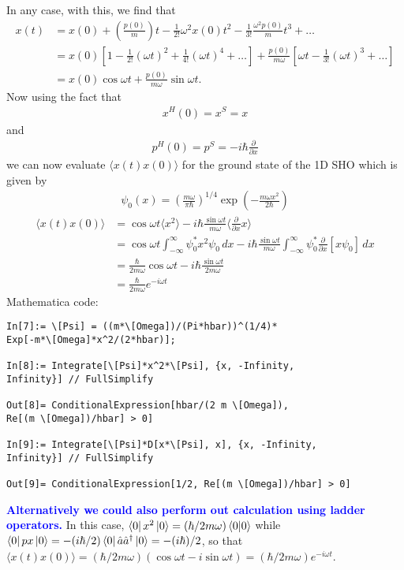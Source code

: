 \documentclass{article}
\theoremstyle{definition}
\newcommand{\p}{\partial}
\newcommand{\f}[2]{\frac{#1}{#2}}
\newcommand{\lp}{\left(}
\newcommand{\rp}{\right)}
\newcommand{\lb}{\left[}
\newcommand{\rb}{\right]}
\begin{document}
In any case, with this, we find that
\begin{align*}
x(t) &= x(0) + \lp \f{p(0)}{m} \rp t - \f{1}{2!} \omega^2 x(0) t^2 - \f{1}{3!}\f{\omega^2 p(0)}{m} t^3 + \dots\\
&= x(0)\lb 1 - \f{1}{2!}(\omega t)^2 + \f{1}{4!}(\omega t)^4 + \dots \rb + \f{p(0)}{m\omega}\lb \omega t - \f{1}{3!} (\omega t )^3 + \dots \rb  \\
&= x(0)\cos\omega t + \f{p(0)}{m\omega}\sin\omega t.
\end{align*}
Now using the fact that 
\begin{align*}
x^H(0) = x^S = x 
\end{align*}
and 
\begin{align*}
p^H(0) = p^S = -i\hbar \f{\p}{\p x}
\end{align*}
we can now evaluate $\langle x(t) x(0)\rangle$ for the ground state of the 1D SHO which is given by 
\begin{align*}
\psi_0(x) = \lp \f{m\omega}{\pi \hbar} \rp^{1/4} \exp\lp -\f{m\omega x^2}{2\hbar} \rp
\end{align*}
\begin{align*}
\langle x(t) x(0) \rangle 
&= \cos\omega t \langle x^2  \rangle -i\hbar \f{\sin\omega t}{m\omega} \bigg\langle  \f{\p}{\p x} x\bigg\rangle\\
&= \cos\omega t \int_{-\infty}^\infty \psi_0^* x^2 \psi_0 \,dx -i\hbar \f{\sin\omega t}{m\omega }\int_{-\infty}^\infty \psi_0^* \f{\p}{\p x}\lb x\psi_0 \rb\,dx \\
&=  {\f{\hbar}{2m\omega} \cos\omega t - i\hbar\f{\sin \omega t}{2m\omega}}\\
&= \boxed{\f{\hbar}{2m\omega}e^{-i\omega t}}
\end{align*}
Mathematica code:
\begin{lstlisting}
In[7]:= \[Psi] = ((m*\[Omega])/(Pi*hbar))^(1/4)*
Exp[-m*\[Omega]*x^2/(2*hbar)];

In[8]:= Integrate[\[Psi]*x^2*\[Psi], {x, -Infinity, 
Infinity}] // FullSimplify

Out[8]= ConditionalExpression[hbar/(2 m \[Omega]), 
Re[(m \[Omega])/hbar] > 0]

In[9]:= Integrate[\[Psi]*D[x*\[Psi], x], {x, -Infinity, 
Infinity}] // FullSimplify

Out[9]= ConditionalExpression[1/2, Re[(m \[Omega])/hbar] > 0]
\end{lstlisting}

\textbf{\textcolor{blue}{Alternatively we could also perform out calculation using ladder operators.}} In this case, $\bra{0} x^2 \ket{0} = (\hbar/2m\omega) \braket{0}$ while  $\bra{0} p x \ket{0} = -(i\hbar/2)\bra{0} \hat a \hat a^\dagger \ket{0} = -(i\hbar )/2 $, so that $\langle x(t)x(0)\rangle = (\hbar/2m\omega)(\cos\omega t - i\sin\omega t) = (\hbar/2m\omega)e^{-i\omega t}$.\\
\end{document}
